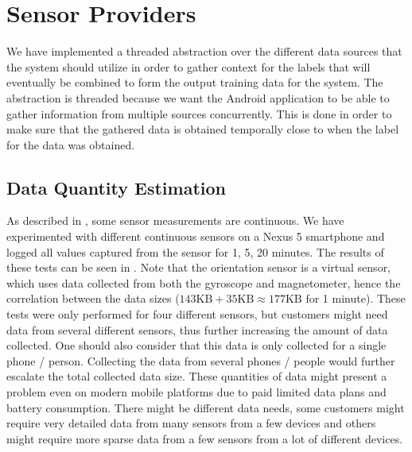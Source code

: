
\section{Sensor Providers}
\label{sec:sensor_providers}

We have implemented a threaded abstraction over the different data sources that the system should utilize in order to gather context for the labels that will eventually be combined to form the output training data for the system. The abstraction is threaded because we want the Android application to be able to gather information from multiple sources concurrently. This is done in order to make sure that the gathered data is obtained temporally close to when the label for the data was obtained. 

\subsection{Data Quantity Estimation}
\label{sub:data_quantity_estimation}

As described in , some sensor measurements are continuous. We have experimented with different continuous sensors on a Nexus 5 smartphone and logged all values captured from the sensor for 1, 5, 20 minutes. The results of these tests can be seen in . Note that the orientation sensor is a virtual sensor, which uses data collected from both the gyroscope and magnetometer, hence the correlation between the data sizes ($143 \text{KB} + 35 \text{KB} \approx 177 \text{KB}$ for 1 minute). These tests were only performed for four different sensors, but customers might need data from several different sensors, thus further increasing the amount of data collected. One should also consider that this data is only collected for a single phone / person. Collecting the data from several phones / people would further escalate the total collected data size. These quantities of data might present a problem even on modern mobile platforms due to paid limited data plans and battery consumption. There might be different data needs, some customers might require very detailed data from many sensors from a few devices and others might require more sparse data from a few sensors from a lot of different devices. 

